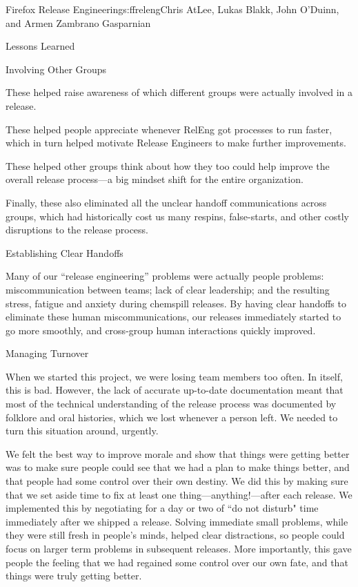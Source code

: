 \begin{aosachapter}{Firefox Release Engineering}{s:ffreleng}{Chris AtLee, Lukas Blakk, John O'Duinn, and Armen Zambrano Gasparnian}
\begin{aosasect1}{Lessons Learned}
\begin{aosasect2}{Involving Other Groups}
\begin{aosaitemize}
\item These helped raise awareness of which different groups were actually
involved in a release.
\item These helped people appreciate whenever RelEng got processes to run
faster, which in turn helped motivate Release Engineers to make further
improvements.
\item These helped other groups think about how they too could help improve the
overall release process---a big mindset shift for the entire organization.
\item Finally, these also eliminated all the unclear handoff communications
across groups, which had historically cost us many respins, false-starts, and
other costly disruptions to the release process.
\end{aosaitemize}

\end{aosasect2}

\begin{aosasect2}{Establishing Clear Handoffs}

Many of our ``release engineering'' problems were actually people problems:
miscommunication between teams; lack of clear leadership; and the resulting stress, fatigue
and anxiety during chemspill releases. By having clear handoffs to eliminate
these human miscommunications, our releases immediately started to go more
smoothly, and cross-group human interactions quickly improved.

\end{aosasect2}

\begin{aosasect2}{Managing Turnover}

When we started this project, we were losing team members too often. In itself,
this is bad. However, the lack of accurate up-to-date documentation meant that
most of the technical understanding of the release process was documented by
folklore and oral histories, which we lost whenever a person left. We needed to
turn this situation around, urgently.

We felt the best way to improve morale and show that things were getting better
was to make sure people could see that we had a plan to make things better, and
that people had some control over their own destiny. We did this by making sure
that we set aside time to fix at least one thing---anything!---after each
release. We implemented this by negotiating for a day or two of ``do not disturb"
time immediately after we shipped a release. Solving immediate small problems,
while they were still fresh in people's minds, helped clear distractions, so
people could focus on larger term problems in subsequent releases. More
importantly, this gave people the feeling that we had regained some control
over our own fate, and that things were truly getting better.


\end{aosasect2}
\end{aosasect1}
\end{aosachapter}
